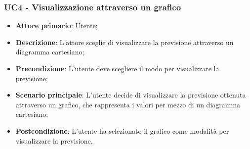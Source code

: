 \subsubsection{UC4 - Visualizzazione attraverso un grafico}
\label{sssec:uc4}
\begin{itemize}
  \item \textbf{Attore primario}: Utente;
  \item \textbf{Descrizione}: L'attore sceglie di visualizzare la previsione attraverso un diagramma cartesiano;
  \item \textbf{Precondizione}: L'utente deve scegliere il modo per visualizzare la previsione;
  \item \textbf{Scenario principale}: L'utente decide di visualizzare la previsione ottenuta attraverso un grafico, che rappresenta i valori per mezzo di un diagramma cartesiano;
  \item \textbf{Postcondizione}: L'utente ha selezionato il grafico come modalità per visualizzare la previsione.
\end{itemize}
